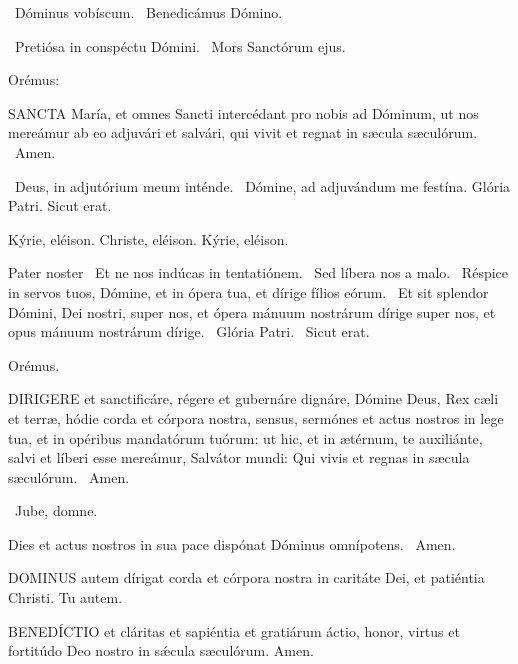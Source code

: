 \V\ Dóminus vobíscum. \V\ Benedicámus Dómino.


\V\ Pretiósa in conspéctu Dómini. \R\ Mors Sanctórum ejus.

 Orémus:


\lettrine[lines=2]{S}{ANCTA} María, et omnes Sancti intercédant pro nobis ad Dóminum, ut nos mereámur ab eo adjuvári et salvári, qui vivit et regnat in sæcula sæculórum. \R\ Amen.

\V\ Deus, in adjutórium meum inténde. \R\ Dómine, ad adjuvándum me festína.  Glória Patri. Sicut erat.

Kýrie, eléison. Christe, eléison. Kýrie, eléison.

Pater noster  \V\ Et ne nos indúcas in tentatiónem. \R\ Sed líbera nos a malo. \V\ Réspice in servos tuos, Dómine, et in ópera tua, et dírige fílios eórum. \R\ Et sit splendor Dómini, Dei nostri, super nos, et ópera mánuum nostrárum dírige super nos, et opus mánuum nostrárum dírige. \V\ Glória Patri. \R\ Sicut erat.

Orémus. 

\lettrine[lines=2]{D}{IRIGERE} et sanctificáre, régere et gubernáre dignáre, Dómine Deus, Rex cæli et terræ, hódie corda et córpora nostra, sensus, sermónes et actus nostros in lege tua, et in opéribus mandatórum tuórum: ut hic, et in ætérnum, te auxiliánte, salvi et líberi esse mereámur, Salvátor mundi: Qui vivis et regnas in sæcula sæculórum. \R\ Amen.

\V\ Jube, domne.

 Dies et actus nostros in sua pace dispónat Dóminus omnípotens. \R\ Amen.


\lettrine[lines=2]{D}{OMINUS} autem dírigat corda et córpora nostra in caritáte Dei, et patiéntia Christi. Tu autem.



\lettrine[lines=2]{B}{ENEDÍCTIO} et cláritas et sapiéntia et gratiárum áctio, honor, virtus et fortitúdo Deo nostro in sǽcula sæculórum. Amen.




